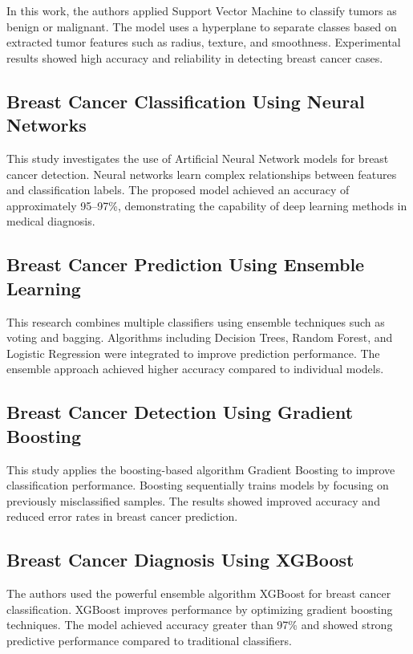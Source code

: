 \documentclass[12pt]{article}
\begin{document}
In this work, the authors applied Support Vector Machine to classify tumors as benign or malignant. The model uses a hyperplane to separate classes based on extracted tumor features such as radius, texture, and smoothness. Experimental results showed high accuracy and reliability in detecting breast cancer cases.

\subsection{Breast Cancer Classification Using Neural Networks}

This study investigates the use of Artificial Neural Network models for breast cancer detection. Neural networks learn complex relationships between features and classification labels. The proposed model achieved an accuracy of approximately 95--97\%, demonstrating the capability of deep learning methods in medical diagnosis.

\subsection{Breast Cancer Prediction Using Ensemble Learning}

This research combines multiple classifiers using ensemble techniques such as voting and bagging. Algorithms including Decision Trees, Random Forest, and Logistic Regression were integrated to improve prediction performance. The ensemble approach achieved higher accuracy compared to individual models.

\subsection{Breast Cancer Detection Using Gradient Boosting}

This study applies the boosting-based algorithm Gradient Boosting to improve classification performance. Boosting sequentially trains models by focusing on previously misclassified samples. The results showed improved accuracy and reduced error rates in breast cancer prediction.

\subsection{Breast Cancer Diagnosis Using XGBoost}

The authors used the powerful ensemble algorithm XGBoost for breast cancer classification. XGBoost improves performance by optimizing gradient boosting techniques. The model achieved accuracy greater than 97\% and showed strong predictive performance compared to traditional classifiers.
\end{document}
